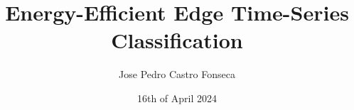 \documentclass[]{iisreport}
\title{Energy-Efficient Edge Time-Series Classification}
\author{Jose Pedro Castro Fonseca}
\date{16th of April 2024}
\begin{document}
\frontmatter





\tableofcontents

\mainmatter



%




\appendix

%

\backmatter


\listofacronyms

\listoffigures
\listoftables


\end{document}
